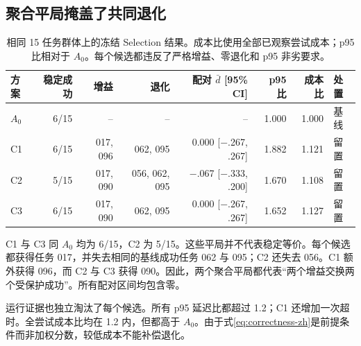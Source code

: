 \documentclass[UTF8,10pt,twocolumn,fontset=none]{ctexart}
\begin{document}
\subsection{聚合平局掩盖了共同退化}

\begin{table}[t]
\centering
\small
\setlength{\tabcolsep}{5pt}
\begin{tabular}{lrrrrrrl}
\toprule
方案 & 稳定成功 & 增益 & 退化 & 配对 $\bar d$ [95\% CI] & p95 比 & 成本比 & 处置 \\
\midrule
$A_0$ & 6/15 & -- & -- & -- & 1.000 & 1.000 & 基线 \\
C1 & 6/15 & 017, 096 & 062, 095 & 0.000 [$-$.267, .267] & 1.882 & 1.121 & 留置 \\
C2 & 5/15 & 017, 090 & 056, 062, 095 & $-$.067 [$-$.333, .200] & 1.670 & 1.108 & 留置 \\
C3 & 6/15 & 017, 090 & 062, 095 & 0.000 [$-$.267, .267] & 1.652 & 1.127 & 留置 \\
\bottomrule
\end{tabular}
\caption{相同 15 任务群体上的冻结 Selection 结果。成本比使用全部已观察尝试成本；p95 比相对于 $A_0$。每个候选都违反了严格增益、零退化和 p95 非劣要求。}
\label{tab:selection-zh}
\end{table}

C1 与 C3 同 $A_0$ 均为 6/15，C2 为 5/15。这些平局并不代表稳定等价。每个候选都获得任务 017，并失去相同的基线成功任务 062 与 095；C2 还失去 056。C1 额外获得 096，而 C2 与 C3 获得 090。因此，两个聚合平局都代表“两个增益交换两个受保护成功”。所有配对区间均包含零。

运行证据也独立淘汰了每个候选。所有 p95 延迟比都超过 1.2；C1 还增加一次超时。全尝试成本比均在 1.2 内，但都高于 $A_0$。由于式\ref{eq:correctness-zh}是前提条件而非加权分数，较低成本不能补偿退化。
\end{document}
